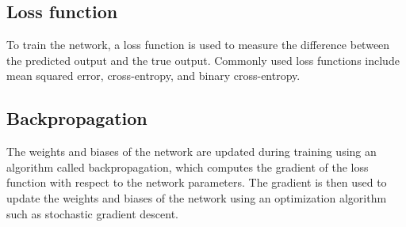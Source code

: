 \documentclass[a4paper]{sapthesis}
\begin{document}
\subsection{Loss function} \label{sec:loss}
To train the network, a loss function is used to measure
 the difference between the predicted output and the true output. Commonly
  used loss functions include mean squared error, cross-entropy, and binary
   cross-entropy.
\subsection{Backpropagation}\label{sec:backpropagation}
 The weights and biases of the network are updated during 
training using an algorithm called backpropagation, which computes the 
gradient of the loss function with respect to the network parameters.
 The gradient is then used to update the weights and biases of the network
  using an optimization algorithm such as stochastic gradient descent.
\end{document}
